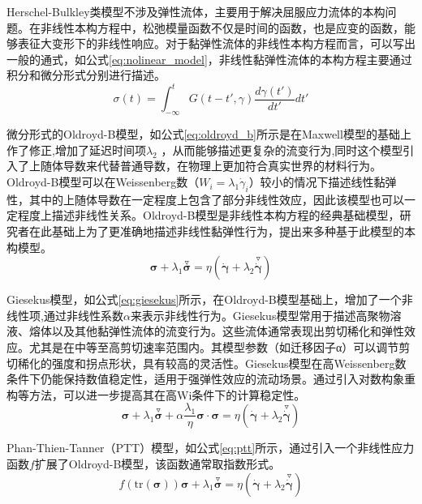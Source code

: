 Herschel-Bulkley类模型不涉及弹性流体，主要用于解决屈服应力流体的本构问题。在非线性本构方程中，松弛模量函数不仅是时间的函数，也是应变的函数，能够表征大变形下的非线性响应。对于黏弹性流体的非线性本构方程而言，可以写出一般的通式，如公式\eqref{eq:nolinear_model}，非线性黏弹性流体的本构方程主要通过积分和微分形式分别进行描述\cite{ewoldtDesigningComplexFluids2022}。
\begin{equation}
  \sigma(t) = \int_{-\infty}^{t} G(t-t',\gamma) \frac{d\gamma(t')}{dt'} dt' \label{eq:nolinear_model}
\end{equation}

微分形式的Oldroyd-B模型，如公式\eqref{eq:oldroyd_b}所示是在Maxwell模型的基础上作了修正,增加了延迟时间项$\lambda_2$ ，从而能够描述更复杂的流变行为,同时这个模型引入了上随体导数来代替普通导数，在物理上更加符合真实世界的材料行为\cite{oldroyd1958non}。Oldroyd-B模型可以在Weissenberg数（$W_i=\lambda_1 \dot{\gamma}_i$）较小的情况下描述线性黏弹性，其中的上随体导数在一定程度上包含了部分非线性效应，因此该模型也可以一定程度上描述非线性关系。Oldroyd-B模型是非线性本构方程的经典基础模型，研究者在此基础上为了更准确地描述非线性黏弹性行为，提出来多种基于此模型的本构模型。
\begin{equation}
  \boldsymbol{\sigma} + \lambda_1 \stackrel{\triangledown}{\boldsymbol{\sigma}} = \eta \left( \dot{\boldsymbol{\gamma}} + \lambda_2 \stackrel{\triangledown}{\dot{\boldsymbol{\gamma}}} \right) \label{eq:oldroyd_b}
\end{equation}

Giesekus模型，如公式\eqref{eq:giesekus}所示，在Oldroyd-B模型基础上，增加了一个非线性项,通过非线性系数$\alpha$来表示非线性行为\cite{giesekus1982simple}。Giesekus模型常用于描述高聚物溶液、熔体以及其他黏弹性流体的流变行为。这些流体通常表现出剪切稀化和弹性效应。尤其是在中等至高剪切速率范围内。其模型参数（如迁移因子α）可以调节剪切稀化的强度和拐点形状，具有较高的灵活性\cite{PENG2021104571,kim2024viscosity}。Giesekus模型在高Weissenberg数条件下仍能保持数值稳定性，适用于强弹性效应的流动场景。通过引入对数构象重构等方法，可以进一步提高其在高Wi条件下的计算稳定性\cite{fattal2004constitutive}。
\begin{equation}
  \boldsymbol{\sigma} + \lambda_1 \stackrel{\triangledown}{\boldsymbol{\sigma}} + \alpha \frac{\lambda_1}{\eta} \boldsymbol{\sigma} \cdot \boldsymbol{\sigma} = \eta \left( \dot{\boldsymbol{\gamma}} + \lambda_2 \stackrel{\triangledown}{\dot{\boldsymbol{\gamma}}} \right) \label{eq:giesekus}
\end{equation}

Phan-Thien-Tanner（PTT）模型，如公式\eqref{eq:ptt}所示，通过引入一个非线性应力函数$f$扩展了Oldroyd-B模型，该函数通常取指数形式\cite{thien1977new}。
\begin{equation}
  f(\text{tr}(\boldsymbol{\sigma})) \boldsymbol{\sigma} + \lambda_1 \stackrel{\triangledown}{\boldsymbol{\sigma}} = \eta \left( \dot{\boldsymbol{\gamma}} + \lambda_2 \stackrel{\triangledown}{\dot{\boldsymbol{\gamma}}} \right) \label{eq:ptt}
\end{equation}

